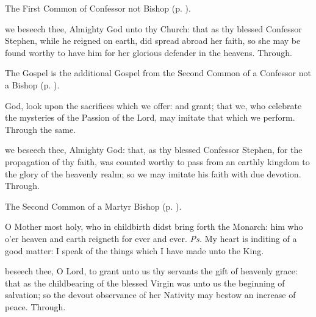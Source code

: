 
\begin{rubric}
	The First Common of Confessor not Bishop (p. \pageref{CommonConfessorNotBishopI}).
\end{rubric}

\collect
{} we beseech thee, Almighty God unto thy Church: that as thy blessed Confessor Stephen, while he reigned on earth, did spread abroad her faith, so she may be found worthy to have him for her glorious defender in the heavens. Through.

\begin{rubric}
	The Gospel is the additional Gospel from the Second Common of a Confessor not a Bishop (p. \pageref{Luke1912}).
\end{rubric}

\secret
{} God, look upon the sacrifices which we offer: and grant; that we, who celebrate the mysteries of the Passion of the Lord, may imitate that which we perform. Through the same.

\postcommunion
{} we beseech thee, Almighty God: that, as thy blessed Confessor Stephen, for the propagation of thy faith, was counted worthy to pass from an earthly kingdom to the glory of the heavenly realm; so we may imitate his faith with due devotion. Through.



\begin{rubric}
	The Second Common of a Martyr Bishop (p. \pageref{CommonMartyrBishopII}).
\end{rubric}


\clearpage
{}

\introit
{} O Mother most holy, who in childbirth didst bring forth the Monarch: him who o'er heaven and earth reigneth for ever and ever. \textit{Ps.} My heart is inditing of a good matter: I speak of the things which I have made unto the King.

\collect
{} beseech thee, O Lord, to grant unto us thy servants the gift of heavenly grace: that as the childbearing of the blessed Virgin was unto us the beginning of salvation; so the devout observance of her Nativity may bestow an increase of peace. Through.

